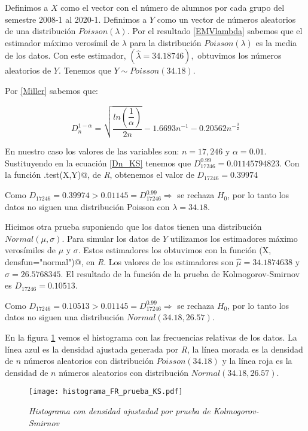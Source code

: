 Definimos a $X$ como el vector con el número de alumnos por cada grupo del semestre 2008-1 al 2020-1. Definimos a $Y$ como un vector de números aleatorios de una distribución $Poisson(\lambda)$. Por el resultado \ref{EMVlambda} sabemos que el estimador máximo verosímil de $\lambda$ para la distribución $Poisson(\lambda)$ es la media de los datos. Con este estimador, $(\hat{\lambda} = 34.18746),$ obtuvimos los números aleatorios de $Y$. Tenemos que $Y \sim Poisson(34.18)$.

Por \ref{Miller} sabemos que:

\begin{equation}\label{Dn_KS}
D_{n}^{1-\alpha} = \sqrt{\dfrac{ln \left(\dfrac{1}{\alpha}\right)}{2n}} - 1.6693 n^{-1} - 0.20562 n^{-\frac{3}{2}}
\end{equation}

En nuestro caso los valores de las variables son: $n = 17,246$ y $\alpha = 0.01$. Sustituyendo en la ecuación \ref{Dn_KS} tenemos que $D_{17246}^{0.99} = 0.01145794823$. Con la función \verb@ks.test(X,Y)@, de \textit{R}, obtenemos el valor de $D_{17246} = 0.39974$

Como $D_{17246} = 0.39974 > 0.01145 = D_{17246}^{0.99} \Rightarrow $ se rechaza $H_{0}$, por lo tanto los datos no siguen una distribución Poisson con $\lambda = 34.18$.


Hicimos otra prueba suponiendo que los datos tienen una distribución $Normal(\mu,\sigma)$. Para simular los datos de $Y$ utilizamos los estimadores máximo verosímiles de $\mu$ y $\sigma$. Estos estimadores los obtuvimos con la función \verb@fitdistr(X, densfun="normal")@, en \textit{R}. Los valores de los estimadores son $\hat{\mu} = 34.1874638$ y $\hat{\sigma} = 26.5768345$. El resultado de la función de la prueba de Kolmogorov-Smirnov es $D_{17246} = 0.10513$.

Como $D_{17246} = 0.10513 > 0.01145 = D_{17246}^{0.99} \Rightarrow $ se rechaza $H_{0}$, por lo tanto los datos no siguen una distribución $Normal(34.18,26.57)$.

En la figura \ref{histFR_pruebaKS} vemos el histograma con las frecuencias relativas de los datos. La línea azul es la densidad ajustada generada por \textit{R}, la línea morada es la densidad de $n$ números aleatorios con distribución  $Poisson(34.18)$ y la línea roja es la densidad de $n$ números aleatorios con distribución  $Normal(34.18,26.57)$.

\begin{figure}[H]
\centering
\texttt{[image: histograma\_FR\_prueba\_KS.pdf]} %
\caption{\textit{Histograma con densidad ajustadad por prueba de Kolmogorov-Smirnov}}\label{histFR_pruebaKS}
\end{figure}

